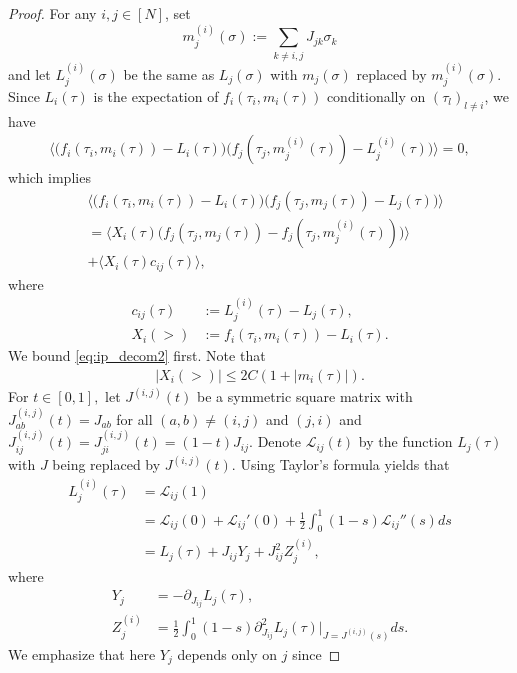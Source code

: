 \documentclass[letterpaper,11pt,reqno]{amsart}
\renewcommand{\le}{\leqslant}
\newcommand{\ra}{\rangle}
\newcommand{\la}{\langle}
\newcommand{\mvgs}{{\sigma}}
\newcommand{\mvgt}{{\tau}}
\begin{document}
\begin{proof}
For any $i,j\in[N]$, set 
$$
m_j^{(i)}(\mvgs):=\sum_{k\neq i, j}J_{jk}\sigma_k
$$ 
and let $L^{(i)}_j(\mvgs)$ be the same as $L_j(\mvgs)$ with $m_j(\mvgs)$ replaced by $m_j^{(i)}(\mvgs)$.
Since $L_i(\tau)$ is the expectation of $f_i(\tau_i, m_i(\mvgt))$ conditionally on $(\tau_l)_{l\neq i}$, we have
\begin{align*}
    \bigl\la\bigl(f_i(\tau_i,m_i(\mvgt))-L_i(\mvgt)\bigr)
    \bigl(f_j(\tau_j,m_j^{(i)}(\mvgt))-L_j^{(i)}(\mvgt)\bigr)\bigr\ra=0,
\end{align*}
which implies
\begin{align}
   &  \bigl\la \bigl(f_i(\tau_i, m_i(\mvgt) )-L_i(\mvgt)\bigr)\bigl(f_j(\tau_j, m_j(\mvgt) )-L_j(\mvgt)\bigr)\bigr\ra  \nonumber\\
    & = \bigl\la  X_i(\tau) \big (f_j(\tau_j, m_j(\mvgt))-f_j(\tau_j, m_j^{(i)}(\mvgt))\big ) \bigr\ra \label{eq:ip_decom1}\\
    & + \bigl\la X_i(\tau)c_{ij}(\mvgt)\bigr\ra, \label{eq:ip_decom2}
\end{align}
where
\begin{align*}
c_{ij}(\mvgt)&:=L_j^{(i)}(\mvgt)-L_j(\mvgt),\\
X_i(\gt)&:= f_i(\tau_i,  m_i(\mvgt) )-L_i(\mvgt).
\end{align*}
We bound \eqref{eq:ip_decom2} first.
Note that 
\begin{align}\label{ProofofCor2.2:eq0}
|X_i(\gt)| \le 2 C(1+|m_i(\tau)|).
\end{align}
For $t\in [0,1],$ let $J^{(i,j)}(t)$ be a symmetric square matrix with $J_{ab}^{(i,j)}(t)=J_{ab}$ for all $(a,b)\neq (i,j)$ and $(j,i)$ and $J_{ij}^{(i,j)}(t)=J_{ji}^{(i,j)}(t)=(1-t)J_{ij}.$ Denote $\mathcal{L}_{ij}(t)$ by the function $L_j(\tau)$ with $J$ being replaced by $J^{(i,j)}(t)$. Using Taylor's formula yields that
\begin{align*}
    L_j^{(i)}(\mvgt)&=\mathcal{L}_{ij}(1)\\
    &=\mathcal{L}_{ij}(0)+\mathcal{L}_{ij}'(0)+\frac{1}{2}\int_0^1(1-s)\mathcal{L}_{ij}''(s)ds\\
    &=L_j(\tau)+J_{ij}Y_j+J_{ij}^2Z_j^{(i)},
\end{align*}
where
\begin{align*}
    Y_j&=-\partial_{J_{ij}}L_j(\tau),\\
    Z_j^{(i)}&=\frac{1}{2}\int_0^1(1-s)\partial_{J_{ij}}^2L_j(\tau)\Big|_{J=J^{(i,j)}(s)}ds.
\end{align*}
We emphasize that here $Y_j$ depends only on $j$ since

\end{proof}
\end{document}
